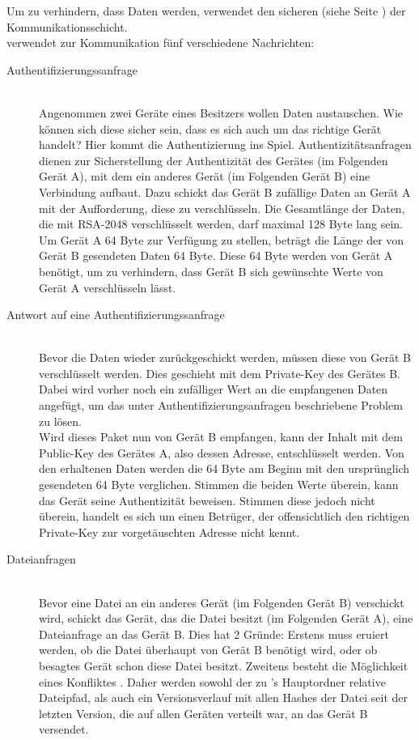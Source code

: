 Um zu verhindern, dass Daten werden, verwendet \sblit den sicheren  (siehe Seite \pageref{Applicationchannel}) der Kommunikationsschicht.\\
\sblitg verwendet zur Kommunikation fünf verschiedene Nachrichten:
\begin{description}
	\item [{Authentifizierungssanfrage}] \hfill \\
		Angenommen zwei Geräte eines Besitzers wollen Daten austauschen. Wie können sich diese sicher sein, dass es sich auch um das richtige Gerät handelt? Hier kommt die Authentizierung ins Spiel. Authentizitätsanfragen dienen zur Sicherstellung der Authentizität des Gerätes (im 	Folgenden Gerät A), mit dem ein anderes Gerät (im Folgenden Gerät B) eine Verbindung aufbaut. Dazu schickt das Gerät B zufällige Daten an Gerät A mit der Aufforderung, diese zu verschlüsseln. Die Gesamtlänge der Daten, die mit RSA-2048 verschlüsselt werden, darf maximal 128 Byte lang sein. Um Gerät A 64 Byte zur Verfügung zu stellen, beträgt die Länge der von Gerät B gesendeten Daten 64 Byte. Diese 64 Byte werden von Gerät A benötigt, um zu verhindern, dass Gerät B sich gewünschte Werte von Gerät A verschlüsseln lässt.

	\item [{Antwort auf eine Authentifizierungssanfrage}] \hfill \\
		Bevor die Daten wieder zurückgeschickt werden, müssen diese von Gerät B verschlüsselt werden. Dies geschieht mit dem Private-Key des Gerätes B. Dabei wird vorher noch ein zufälliger Wert an die empfangenen Daten angefügt, um das unter Authentifizierungsanfragen beschriebene Problem zu lösen.\\
		Wird dieses Paket nun von Gerät B empfangen, kann der Inhalt mit dem Public-Key des Gerätes A, also dessen Adresse, entschlüsselt werden. Von den erhaltenen Daten werden die 64 Byte am Beginn mit den ursprünglich gesendeten 64 Byte verglichen. Stimmen die beiden Werte überein, kann das Gerät seine Authentizität beweisen. Stimmen diese jedoch nicht überein, handelt es sich um einen Betrüger, der offensichtlich den richtigen Private-Key zur vorgetäuschten Adresse nicht kennt.
		
	\item [{Dateianfragen}] \label{Dateianfrage} \hfill \\
		Bevor eine Datei an ein anderes Gerät (im Folgenden Gerät B) verschickt wird, schickt das Gerät, das die Datei besitzt (im Folgenden Gerät A), eine Dateianfrage an das Gerät B. Dies hat 2 Gründe: Erstens muss eruiert werden, ob die Datei überhaupt von Gerät B benötigt wird, oder ob besagtes Gerät schon diese Datei besitzt. Zweitens besteht die Möglichkeit eines Konfliktes . Daher werden sowohl der zu \sblit's Hauptordner relative Dateipfad, als auch ein Versionsverlauf mit allen Hashes der Datei seit der letzten Version, die auf allen Geräten verteilt war, an das Gerät B versendet. 
		

\end{description}
